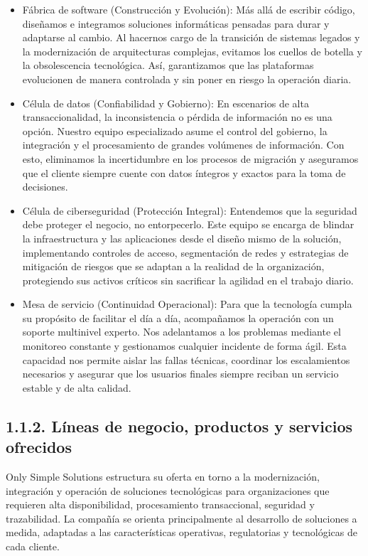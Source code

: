 \documentclass[11pt]{article}
\providecommand{\tightlist}{%
  \setlength{\itemsep}{0pt}\setlength{\parskip}{0pt}}
\begin{document}
\begin{itemize}
\tightlist
\item
  Fábrica de software (Construcción y Evolución): Más allá de escribir código, diseñamos e integramos soluciones informáticas pensadas para durar y adaptarse al cambio. Al hacernos cargo de la transición de sistemas legados y la modernización de arquitecturas complejas, evitamos los cuellos de botella y la obsolescencia tecnológica. Así, garantizamos que las plataformas evolucionen de manera controlada y sin poner en riesgo la operación diaria.
\item
  Célula de datos (Confiabilidad y Gobierno): En escenarios de alta transaccionalidad, la inconsistencia o pérdida de información no es una opción. Nuestro equipo especializado asume el control del gobierno, la integración y el procesamiento de grandes volúmenes de información. Con esto, eliminamos la incertidumbre en los procesos de migración y aseguramos que el cliente siempre cuente con datos íntegros y exactos para la toma de decisiones.
\item
  Célula de ciberseguridad (Protección Integral): Entendemos que la seguridad debe proteger el negocio, no entorpecerlo. Este equipo se encarga de blindar la infraestructura y las aplicaciones desde el diseño mismo de la solución, implementando controles de acceso, segmentación de redes y estrategias de mitigación de riesgos que se adaptan a la realidad de la organización, protegiendo sus activos críticos sin sacrificar la agilidad en el trabajo diario.
\item
  Mesa de servicio (Continuidad Operacional): Para que la tecnología cumpla su propósito de facilitar el día a día, acompañamos la operación con un soporte multinivel experto. Nos adelantamos a los problemas mediante el monitoreo constante y gestionamos cualquier incidente de forma ágil. Esta capacidad nos permite aislar las fallas técnicas, coordinar los escalamientos necesarios y asegurar que los usuarios finales siempre reciban un servicio estable y de alta calidad.
\end{itemize}

\subsection{1.1.2. Líneas de negocio, productos y servicios ofrecidos}\label{luxedneas-de-negocio-productos-y-servicios-ofrecidos}

Only Simple Solutions estructura su oferta en torno a la modernización, integración y operación de soluciones tecnológicas para organizaciones que requieren alta disponibilidad, procesamiento transaccional, seguridad y trazabilidad. La compañía se orienta principalmente al desarrollo de soluciones a medida, adaptadas a las características operativas, regulatorias y tecnológicas de cada cliente.
\end{document}
